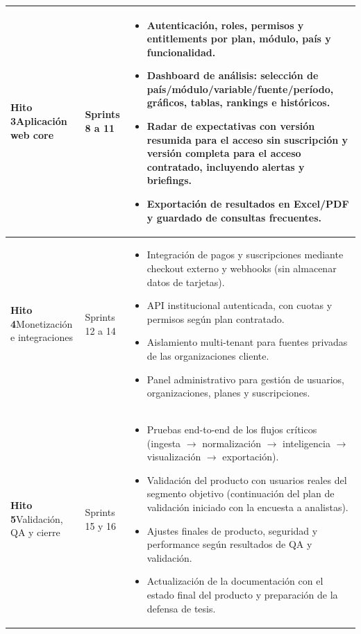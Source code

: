 \documentclass[11pt,a4paper]{article}
\begin{document}
\begin{longtable}{@{}>{\raggedright\arraybackslash}p{2.6cm} >{\raggedright\arraybackslash}p{2cm} >{\raggedright\arraybackslash}p{\dimexpr\textwidth-2.6cm-2cm-6\tabcolsep\relax}@{}}
\textbf{Hito 3}\newline Aplicaci\'on web core & Sprints 8 a 11 &
\begin{itemize}[leftmargin=1em]
  \item Autenticaci\'on, roles, permisos y entitlements por plan, m\'odulo, pa\'is y funcionalidad.
  \item Dashboard de an\'alisis: selecci\'on de pa\'is/m\'odulo/variable/fuente/per\'iodo, gr\'aficos, tablas, rankings e hist\'oricos.
  \item Radar de expectativas con versi\'on resumida para el acceso sin suscripci\'on y versi\'on completa para el acceso contratado, incluyendo alertas y briefings.
  \item Exportaci\'on de resultados en Excel/PDF y guardado de consultas frecuentes.
\end{itemize} \\
\midrule

\textbf{Hito 4}\newline Monetizaci\'on e integraciones & Sprints 12 a 14 &
\begin{itemize}[leftmargin=1em]
  \item Integraci\'on de pagos y suscripciones mediante checkout externo y webhooks (sin almacenar datos de tarjetas).
  \item API institucional autenticada, con cuotas y permisos seg\'un plan contratado.
  \item Aislamiento multi-tenant para fuentes privadas de las organizaciones cliente.
  \item Panel administrativo para gesti\'on de usuarios, organizaciones, planes y suscripciones.
\end{itemize} \\
\midrule

\textbf{Hito 5}\newline Validaci\'on, QA y cierre & Sprints 15 y 16 &
\begin{itemize}[leftmargin=1em]
  \item Pruebas end-to-end de los flujos cr\'iticos (ingesta $\rightarrow$ normalizaci\'on $\rightarrow$ inteligencia $\rightarrow$ visualizaci\'on $\rightarrow$ exportaci\'on).
  \item Validaci\'on del producto con usuarios reales del segmento objetivo (continuaci\'on del plan de validaci\'on iniciado con la encuesta a analistas).
  \item Ajustes finales de producto, seguridad y performance seg\'un resultados de QA y validaci\'on.
  \item Actualizaci\'on de la documentaci\'on con el estado final del producto y preparaci\'on de la defensa de tesis.
\end{itemize} \\

\end{longtable}
\renewcommand{\arraystretch}{1}
\end{document}
